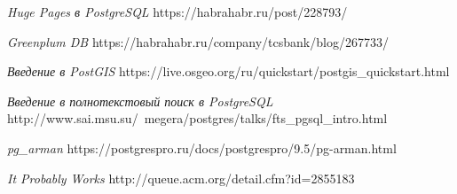 \begin{thebibliography}{9}
  \emph{Huge Pages в PostgreSQL}
  https://habrahabr.ru/post/228793/

  \emph{Greenplum DB}
  https://habrahabr.ru/company/tcsbank/blog/267733/

  \emph{Введение в PostGIS}
  https://live.osgeo.org/ru/quickstart/postgis\_quickstart.html

  \emph{Введение в полнотекстовый поиск в PostgreSQL}
  http://www.sai.msu.su/~megera/postgres/talks/fts\_pgsql\_intro.html

  \emph{pg\_arman}
  https://postgrespro.ru/docs/postgrespro/9.5/pg-arman.html

  \emph{It Probably Works}	
  http://queue.acm.org/detail.cfm?id=2855183

\end{thebibliography}
